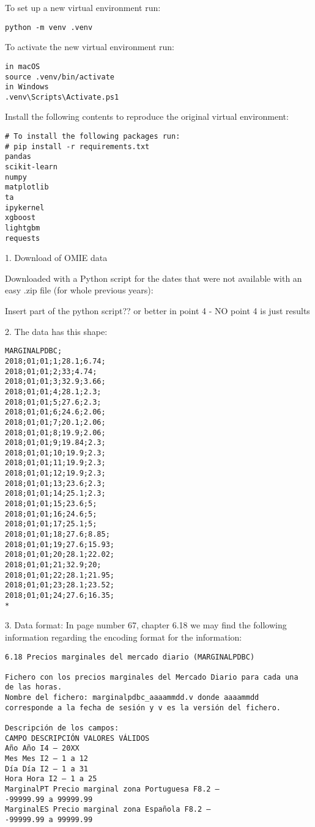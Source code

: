 \documentclass[12pt]{report} %
\begin{document}
To set up a new virtual environment \cite{python_venv} run:
\begin{verbatim}
python -m venv .venv
\end{verbatim}

To activate the new virtual environment run:
\begin{verbatim}
in macOS
source .venv/bin/activate
in Windows
.venv\Scripts\Activate.ps1
\end{verbatim}

Install the following contents to reproduce the original virtual environment:
\begin{verbatim}
# To install the following packages run:
# pip install -r requirements.txt 
pandas
scikit-learn
numpy
matplotlib
ta
ipykernel
xgboost
lightgbm
requests
\end{verbatim}

1. Download of OMIE data
\cite{omie_datos}

Downloaded with a Python script for the dates that were not available with an easy .zip file (for whole previous years):

Insert part of the python script?? or better in point 4 - NO point 4 is just results


2. The data has this shape:
\begin{verbatim}
MARGINALPDBC;
2018;01;01;1;28.1;6.74;
2018;01;01;2;33;4.74;
2018;01;01;3;32.9;3.66;
2018;01;01;4;28.1;2.3;
2018;01;01;5;27.6;2.3;
2018;01;01;6;24.6;2.06;
2018;01;01;7;20.1;2.06;
2018;01;01;8;19.9;2.06;
2018;01;01;9;19.84;2.3;
2018;01;01;10;19.9;2.3;
2018;01;01;11;19.9;2.3;
2018;01;01;12;19.9;2.3;
2018;01;01;13;23.6;2.3;
2018;01;01;14;25.1;2.3;
2018;01;01;15;23.6;5;
2018;01;01;16;24.6;5;
2018;01;01;17;25.1;5;
2018;01;01;18;27.6;8.85;
2018;01;01;19;27.6;15.93;
2018;01;01;20;28.1;22.02;
2018;01;01;21;32.9;20;
2018;01;01;22;28.1;21.95;
2018;01;01;23;28.1;23.52;
2018;01;01;24;27.6;16.35;
*
\end{verbatim}

3. Data format: In page number 67, chapter 6.18 we may find the following information regarding the encoding format for the information: 
\cite{omie_formatos_2024}
\begin{verbatim}
6.18 Precios marginales del mercado diario (MARGINALPDBC)

Fichero con los precios marginales del Mercado Diario para cada una
de las horas.
Nombre del fichero: marginalpdbc_aaaammdd.v donde aaaammdd
corresponde a la fecha de sesión y v es la versión del fichero.

Descripción de los campos:
CAMPO DESCRIPCIÓN VALORES VÁLIDOS
Año Año I4 – 20XX
Mes Mes I2 – 1 a 12
Día Día I2 – 1 a 31
Hora Hora I2 – 1 a 25
MarginalPT Precio marginal zona Portuguesa F8.2 –
-99999.99 a 99999.99
MarginalES Precio marginal zona Española F8.2 –
-99999.99 a 99999.99
\end{verbatim}
\end{document}
